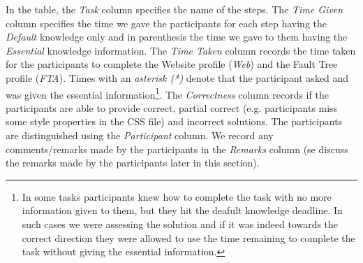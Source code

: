 In the table, the \textit{Task} column specifies the name of the steps. 
The \textit{Time Given} column specifies the time we gave the participants for each step having the \textit{Default} knowledge only and in parenthesis the time we gave to them having the \textit{Essential} knowledge information.
The \textit{Time Taken} column records the time taken for the participants to complete the Website profile (\textit{Web}) and the Fault Tree profile (\textit{FTA}). Times with an \textit{asterisk (*)} denote that the participant asked and was given the essential information\footnote{In some tasks participants knew how to complete the task with no more information given to them, but they hit the deafult knowledge deadline. In such cases we were assessing the solution and if it was indeed towards the correct direction they were allowed to use the time remaining to complete the task without giving the essential information.}.
The \textit{Correctness} column records if the participants are able to provide correct, partial correct (e.g. participants miss some style properties in the CSS file) and incorrect solutions. 
The participants are distinguished using the \textit{Participant} column.
We record any comments/remarks made by the participants in the \textit{Remarks} column (se discuss the remarks made by the participants later in this section).


